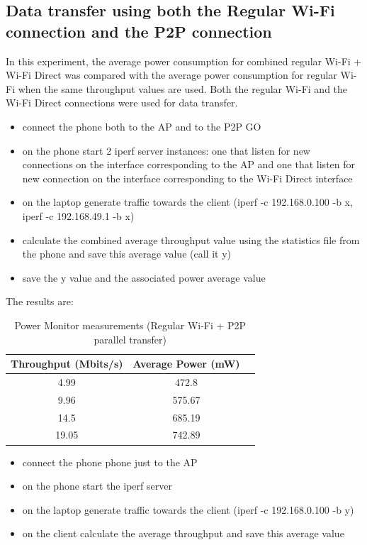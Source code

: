 \subsection{Data transfer using both the Regular Wi-Fi connection and the P2P connection}
\label{sub-sec:transfer-parallel2}

In this experiment, the average power consumption for combined regular Wi-Fi + Wi-Fi Direct was compared with the average power consumption for regular Wi-Fi when the same throughput values are used. Both the regular Wi-Fi and the Wi-Fi Direct connections were used for data transfer.

\begin{itemize}
  \item connect the phone both to the AP and to the P2P GO
  \item on the phone start 2 iperf server instances: one that listen for new connections on the interface corresponding to the AP and one that listen for new connection on the interface corresponding to the Wi-Fi Direct interface
  \item on the laptop generate traffic towards the client (iperf -c 192.168.0.100 -b x, iperf -c 192.168.49.1 -b x)
  \item calculate the combined average throughput value using the statistics file from the phone and save this average value (call it y)
  \item save the y value and the associated power average value 
\end{itemize}

The results are:

\begin{table}[h!]
  \centering
  \caption{Power Monitor measurements (Regular Wi-Fi + P2P parallel transfer)}
  \label{tab:table1}
  \begin{tabular}{ccc}
    \toprule
    Throughput (Mbits/s) & Average Power (mW) \\
    \midrule
     4.99 & 472.8 \\
     9.96 & 575.67 \\
     14.5 & 685.19\\
     19.05 & 742.89 \\
    \bottomrule
  \end{tabular}
\end{table}

\begin{itemize}
  \item connect the phone phone just to the AP
  \item on the phone start the iperf server
  \item on the laptop generate traffic towards the client (iperf -c 192.168.0.100 -b y)
  \item on the client calculate the average throughput and save this average value
\end{itemize}


